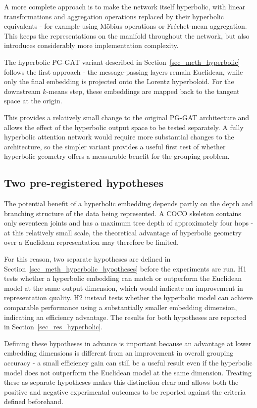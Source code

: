 A more complete approach is to make the network itself hyperbolic,
with linear transformations and aggregation operations replaced by their hyperbolic equivalents -
for example using M\"obius operations or Fr\'echet-mean aggregation.
This keeps the representations on the manifold throughout the network,
but also introduces considerably more implementation complexity.

The hyperbolic PG-GAT variant described in Section~\ref{sec_meth_hyperbolic} follows the first approach -
the message-passing layers remain Euclidean,
while only the final embedding is projected onto the Lorentz hyperboloid.
For the downstream $k$-means step,
these embeddings are mapped back to the tangent space at the origin.

This provides a relatively small change to the original PG-GAT architecture
and allows the effect of the hyperbolic output space to be tested separately.
A fully hyperbolic attention network would require more substantial changes to the architecture,
so the simpler variant provides a useful first test
of whether hyperbolic geometry offers a measurable benefit for the grouping problem.

\subsection{Two pre-registered hypotheses}
\label{sec_lit_geometry_hypotheses}

The potential benefit of a hyperbolic embedding
depends partly on the depth and branching structure of the data being represented.
A COCO skeleton contains only seventeen joints and has a maximum tree depth of approximately four hops -
at this relatively small scale,
the theoretical advantage of hyperbolic geometry over a Euclidean representation may therefore be limited.

For this reason,
two separate hypotheses are defined in Section~\ref{sec_meth_hyperbolic_hypotheses}
before the experiments are run.
H1 tests whether a hyperbolic embedding can match or outperform the Euclidean model at the same output dimension,
which would indicate an improvement in representation quality.
H2 instead tests whether the hyperbolic model can achieve comparable performance
using a substantially smaller embedding dimension,
indicating an efficiency advantage.
The results for both hypotheses are reported in Section~\ref{sec_res_hyperbolic}.

Defining these hypotheses in advance is important
because an advantage at lower embedding dimensions is different from an improvement in overall grouping accuracy -
a small efficiency gain can still be a useful result
even if the hyperbolic model does not outperform the Euclidean model at the same dimension.
Treating these as separate hypotheses makes this distinction clear
and allows both the positive and negative experimental outcomes
to be reported against the criteria defined beforehand.


